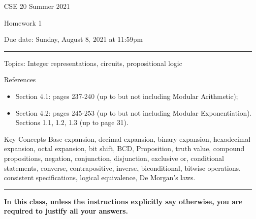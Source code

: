 \documentclass[10pt,letterpaper,unboxed,cm]{article}
\begin{document}
\hfill{CSE 20 Summer 2021}

\hfill{Homework 1}

\hfill{Due date: Sunday, August 8, 2021 at 11:59pm}

\begin{center}
\begin{minipage}[t]{6in}
\rule{\linewidth}{2pt}

{\sc Topics:} Integer representations, circuits, propositional logic
\newline

{\sc References} 
\begin{itemize}
\item Section 4.1: pages 237-240 (up to but not including Modular Arithmetic);
\item Section 4.2: pages 245-253 (up to but not including Modular Exponentiation).
Sections 1.1, 1.2, 1.3 (up to page 31).
\end{itemize}

{\sc Key Concepts} Base expansion, decimal expansion, binary expansion,
hexadecimal expansion, octal expansion, bit shift, 
 BCD,
Proposition, truth value, compound propositions,
negation, conjunction, disjunction, exclusive or,  conditional statements,
converse, contrapositive, inverse, 
biconditional, bitwise operations, consistent specifications, logical equivalence, 
De Morgan's laws.
\newline

\rule{\linewidth}{2pt}
\end{minipage} \hfill

\end{center}



\textbf{In this class, unless the instructions explicitly say otherwise, you are required to justify all your answers.}

 
\end{document}
